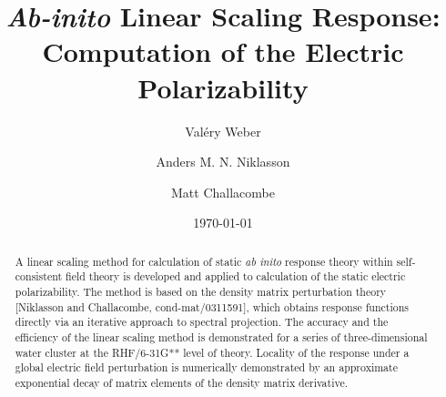 \documentclass[prl,aps,twocolumn,showpacs,twocolumngrid,superbib]{revtex4}
\begin{document}
\title{\emph{Ab-inito} Linear Scaling Response: \\ Computation of the Electric Polarizability}

\author{Val\'ery Weber}
\author{Anders M. N. Niklasson}
\author{Matt Challacombe}

\date{\today}

\begin{abstract}
A linear scaling method for calculation of static {\em ab inito} response theory within self-consistent field theory 
is developed and applied to calculation of the static electric polarizability.  The method is based on the density matrix 
perturbation theory [Niklasson and Challacombe, cond-mat/0311591], which obtains response functions directly via an 
iterative approach to spectral projection. The accuracy and the efficiency of the linear scaling method is demonstrated 
for a series of three-dimensional water cluster at the RHF/6-31G** level of theory.  Locality of the response 
under a global electric field perturbation is numerically demonstrated by an approximate exponential decay of
matrix elements of the density matrix derivative.
\end{abstract}

\maketitle

\end{document}
